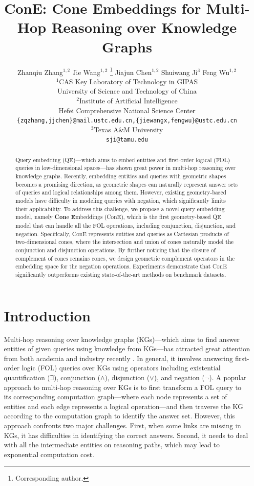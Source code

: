 \documentclass{article}
\title{ConE: Cone Embeddings for Multi-Hop Reasoning over Knowledge Graphs}
\author{%
  Zhanqiu Zhang$^{1,2}$ \qquad
  Jie Wang$^{1,2}$ \thanks{Corresponding author.} \qquad
  Jiajun Chen$^{1,2}$ \qquad
  Shuiwang Ji$^3$ \qquad
  Feng Wu$^{1,2}$ \qquad
  \vspace{1mm}\\
$^1$CAS Key Laboratory of Technology in GIPAS\\
University of Science and Technology of China\\
$^2$Institute of Artificial Intelligence\\
Hefei Comprehensive National Science Center\\
\texttt{\{zqzhang,jjchen\}@mail.ustc.edu.cn,\{jiewangx,fengwu\}@ustc.edu.cn}\\
$^3$Texas A\&M University\\
\texttt{sji@tamu.edu}
}
\begin{document}
\maketitle

\begin{abstract}
Query embedding (QE)---which aims to embed entities and first-order logical (FOL) queries in low-dimensional spaces---has shown great power in multi-hop reasoning over knowledge graphs. 
Recently, embedding entities and queries with geometric shapes becomes a promising direction, as geometric shapes can naturally represent answer sets of queries and logical relationships among them.
However, existing geometry-based models have difficulty in modeling queries with negation, which significantly limits their applicability. 
To address this challenge, we propose a novel query embedding model, namely \textbf{Con}e \textbf{E}mbeddings (ConE), which is the first geometry-based QE model that can handle all the FOL operations, including conjunction, disjunction, and negation.
Specifically, ConE represents entities and queries as Cartesian products of two-dimensional cones, where the intersection and union of cones naturally model the conjunction and disjunction operations. By further noticing that the closure of complement of cones remains cones, we design geometric complement operators in the embedding space for the negation operations.
Experiments demonstrate that ConE significantly outperforms existing state-of-the-art methods on benchmark datasets.
\end{abstract}

\section{Introduction}\label{sec:intro}

Multi-hop reasoning over knowledge graphs (KGs)---which aims to find answer entities of given queries using knowledge from KGs---has attracted great attention from both academia and industry recently \cite{pullnet,emb_kgqa,alime}. In general, it involves answering first-order logic (FOL) queries over KGs using operators including existential quantification ($\exists$), conjunction ($\land$), disjunction ($\lor$), and negation ($\neg$). 
A popular approach to multi-hop reasoning over KGs is to first transform a FOL query to its corresponding computation graph---where each node represents a set of entities and each edge represents a logical operation---and then traverse the KG according to the computation graph to identify the answer set.
However, this approach confronts two major challenges. First, when some links are missing in KGs, it has difficulties in identifying the correct answers. Second, it needs to deal with all the intermediate entities on reasoning paths, which may lead to exponential computation cost.
\end{document}
